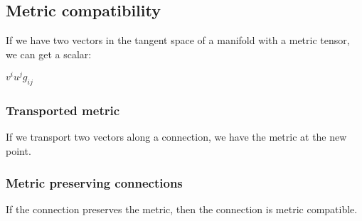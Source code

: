 
\subsection{Metric compatibility}

If we have two vectors in the tangent space of a manifold with a metric tensor, we can get a scalar:

\(v^iu^jg_{ij}\)

\subsubsection{Transported metric}

If we transport two vectors along a connection, we have the metric at the new point.

\subsubsection{Metric preserving connections}

If the connection preserves the metric, then the connection is metric compatible.

